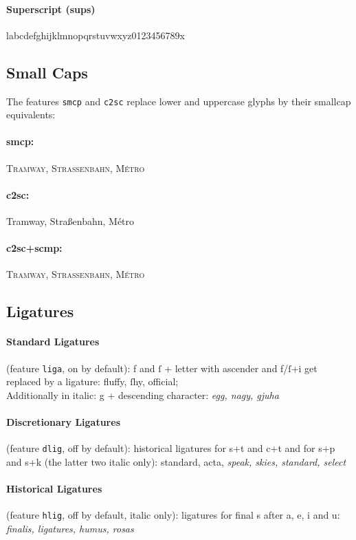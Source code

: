 \documentclass[pagesize,DIV14]{scrartcl}
\begin{document}
\paragraph*{Superscript (sups)} l{abcdefghijklmnopqrstuvwxyz0123456789}x

\subsection{Small Caps}
The features \texttt{smcp} and \texttt{c2sc} replace lower and uppercase glyphs by their smallcap equivalents:
\paragraph*{smcp:} \textsc{Tramway, Straßenbahn, Métro}
\paragraph*{c2sc:} {Tramway, Straßenbahn, Métro}
\paragraph*{c2sc+scmp:} \textsc{Tramway, Straßenbahn, Métro}

\subsection{Ligatures}
\paragraph*{Standard Ligatures} (feature \texttt{liga}, on by default): f and ſ + letter with ascender and f/ſ+i get replaced by a ligature: fluffy, ſhy, official;\\
Additionally in italic: g + descending character: \textit{egg, nagy, gjuha} 
\paragraph*{Discretionary Ligatures} (feature \texttt{dlig}, off by default): historical ligatures for s+t and c+t and for s+p and s+k (the latter two italic only): {standard, acta, \textit{speak, skies, standard, select}}
\paragraph*{Historical Ligatures} (feature \texttt{hlig}, off by default, italic only): ligatures for final s after a, e, i and u: \textit{finalis, ligatures, humus, rosas}
\end{document}
